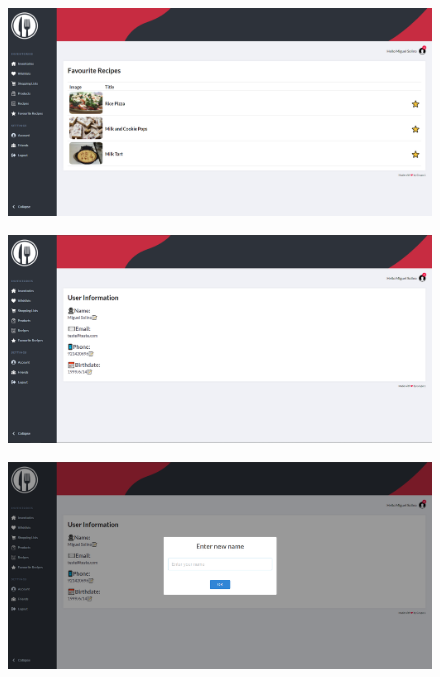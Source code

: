 \documentclass[a4paper]{report}
\begin{document}
    \begin{figure}[H]
        \centering
            \includegraphics[width=\textwidth]{images/produto_final/receitas_favoritas.png}
    \end{figure}

    \begin{figure}[H]
        \centering
            \includegraphics[width=\textwidth]{images/produto_final/pagina_de_perfil.png}
    \end{figure}

    \begin{figure}[H]
        \centering
            \includegraphics[width=\textwidth]{images/produto_final/alterar_nome_perfil.png}
    \end{figure}
\end{document}
